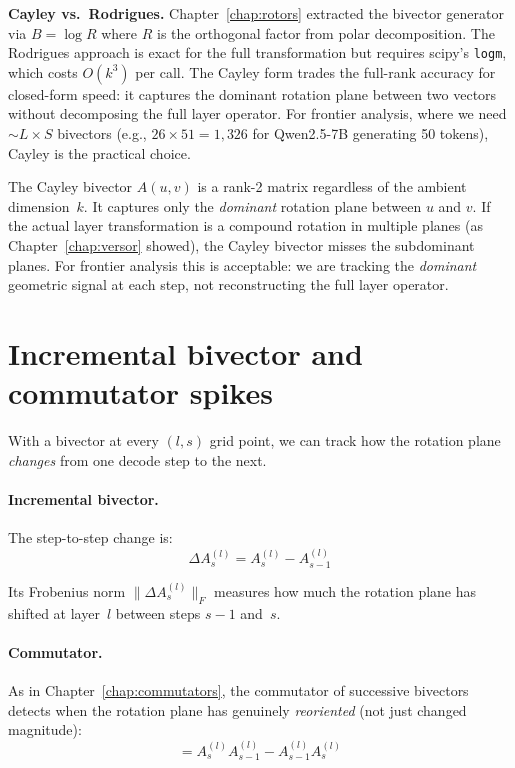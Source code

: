 \documentclass[11pt, twoside, openright]{memoir}
\numberwithin{equation}{chapter}
\begin{document}
\begin{gabox}
\textbf{Cayley vs.\ Rodrigues.}
Chapter~\ref{chap:rotors} extracted the bivector generator via
$B = \log R$ where $R$ is the orthogonal factor from polar
decomposition.  The Rodrigues approach is exact for the full
transformation but requires scipy's \texttt{logm}, which costs
$O(k^3)$ per call.  The Cayley form trades the full-rank accuracy
for closed-form speed: it captures the dominant rotation plane
between two vectors without decomposing the full layer operator.
For frontier analysis, where we need $\sim\!L \times S$ bivectors
(e.g., $26 \times 51 = 1{,}326$ for Qwen2.5-7B generating 50
tokens), Cayley is the practical choice.
\end{gabox}

\begin{pitfall}
The Cayley bivector $A(u,v)$ is a rank-2 matrix regardless of
the ambient dimension~$k$.  It captures only the \emph{dominant}
rotation plane between $u$ and $v$.  If the actual layer
transformation is a compound rotation in multiple planes (as
Chapter~\ref{chap:versor} showed), the Cayley bivector misses the
subdominant planes.  For frontier analysis this is acceptable:
we are tracking the \emph{dominant} geometric signal at each step,
not reconstructing the full layer operator.
\end{pitfall}


\section{Incremental bivector and commutator spikes}
\label{sec:frontier-commutator}

With a bivector at every $(l, s)$ grid point, we can track how the
rotation plane \emph{changes} from one decode step to the next.

\paragraph{Incremental bivector.}
The step-to-step change is:
\begin{equation}
  \Delta A^{(l)}_s = A^{(l)}_s - A^{(l)}_{s-1}
\end{equation}

Its Frobenius norm $\|\Delta A^{(l)}_s\|_F$ measures how much the
rotation plane has shifted at layer~$l$ between steps $s-1$
and~$s$.

\paragraph{Commutator.}
As in Chapter~\ref{chap:commutators}, the commutator of successive
bivectors detects when the rotation plane has genuinely
\emph{reoriented} (not just changed magnitude):
\begin{equation}
  [A^{(l)}_s,\, A^{(l)}_{s-1}]
  = A^{(l)}_s A^{(l)}_{s-1} - A^{(l)}_{s-1} A^{(l)}_s
\end{equation}
\end{document}
